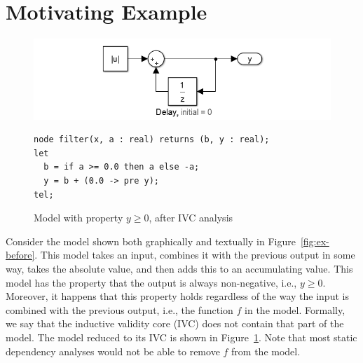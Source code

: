 \section{Motivating Example}
\label{sec:exmpl}

\begin{figure}[t]
\includegraphics[width=\columnwidth]{figs/simulink-ivc.png}
{\smaller
\begin{verbatim}
node filter(x, a : real) returns (b, y : real);
let
  b = if a >= 0.0 then a else -a;
  y = b + (0.0 -> pre y);
tel;
\end{verbatim}
}
\caption{Model with property $y \geq 0$, after IVC analysis}
\label{fig:ex-after}
\end{figure}

Consider the model shown both graphically and textually in
Figure~\ref{fig:ex-before}. This model takes an input, combines it
with the previous output in some way, takes the absolute value, and
then adds this to an accumulating value. This model has the property
that the output is always non-negative, i.e., $y \geq 0$. Moreover, it
happens that this property holds regardless of the way the input is
combined with the previous output, i.e., the function $f$ in the
model. Formally, we say that the inductive validity core (IVC) does
not contain that part of the model. The model reduced to its IVC is
shown in Figure~\ref{fig:ex-after}. Note that most static dependency
analyses would not be able to remove $f$ from the model.


